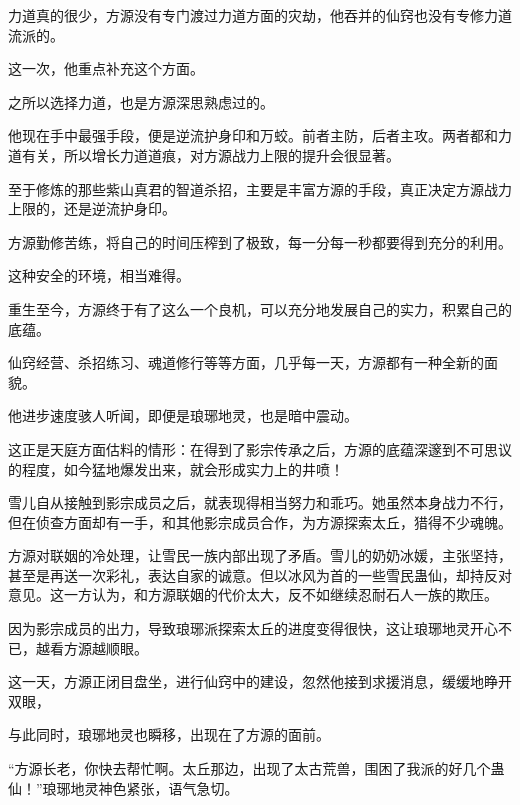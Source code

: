 \begin{this_body}
力道真的很少，方源没有专门渡过力道方面的灾劫，他吞并的仙窍也没有专修力道流派的。

这一次，他重点补充这个方面。

之所以选择力道，也是方源深思熟虑过的。

他现在手中最强手段，便是逆流护身印和万蛟。前者主防，后者主攻。两者都和力道有关，所以增长力道道痕，对方源战力上限的提升会很显著。

至于修炼的那些紫山真君的智道杀招，主要是丰富方源的手段，真正决定方源战力上限的，还是逆流护身印。

方源勤修苦练，将自己的时间压榨到了极致，每一分每一秒都要得到充分的利用。

这种安全的环境，相当难得。

重生至今，方源终于有了这么一个良机，可以充分地发展自己的实力，积累自己的底蕴。

仙窍经营、杀招练习、魂道修行等等方面，几乎每一天，方源都有一种全新的面貌。

他进步速度骇人听闻，即便是琅琊地灵，也是暗中震动。

这正是天庭方面估料的情形：在得到了影宗传承之后，方源的底蕴深邃到不可思议的程度，如今猛地爆发出来，就会形成实力上的井喷！

雪儿自从接触到影宗成员之后，就表现得相当努力和乖巧。她虽然本身战力不行，但在侦查方面却有一手，和其他影宗成员合作，为方源探索太丘，猎得不少魂魄。

方源对联姻的冷处理，让雪民一族内部出现了矛盾。雪儿的奶奶冰媛，主张坚持，甚至是再送一次彩礼，表达自家的诚意。但以冰风为首的一些雪民蛊仙，却持反对意见。这一方认为，和方源联姻的代价太大，反不如继续忍耐石人一族的欺压。

因为影宗成员的出力，导致琅琊派探索太丘的进度变得很快，这让琅琊地灵开心不已，越看方源越顺眼。

这一天，方源正闭目盘坐，进行仙窍中的建设，忽然他接到求援消息，缓缓地睁开双眼，

与此同时，琅琊地灵也瞬移，出现在了方源的面前。

“方源长老，你快去帮忙啊。太丘那边，出现了太古荒兽，围困了我派的好几个蛊仙！”琅琊地灵神色紧张，语气急切。

\end{this_body}

